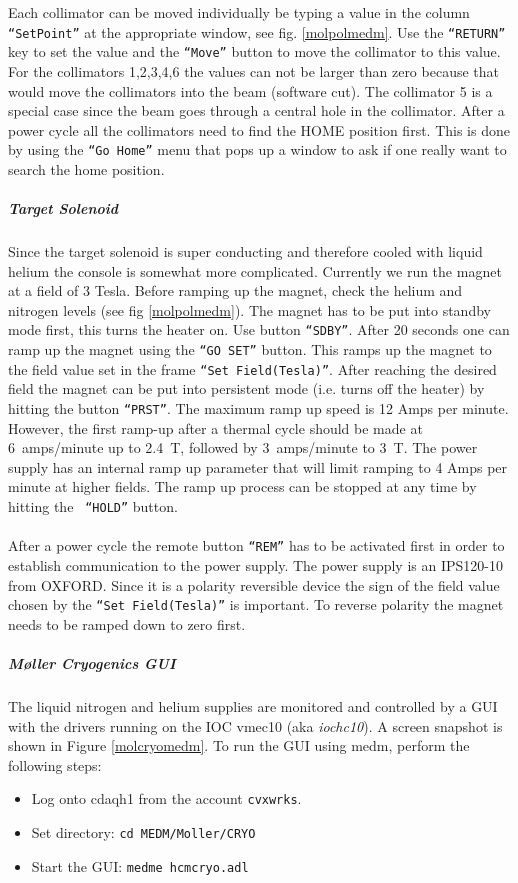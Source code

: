 {Each collimator can be moved individually be typing a value in the 
column {\tt ``SetPoint''}
at the appropriate window, see fig. \ref{molpolmedm}. Use the {\tt ``RETURN''} key
to set the value and the {\tt ``Move''} button to move the collimator
to this value. For the collimators 1,2,3,4,6 the values can not 
be larger than zero because that would move the collimators into the
beam (software cut). The collimator 5 is a special case since the beam goes through
a central hole in the collimator. 
After a power cycle all the collimators need to find the HOME position
first.  This is done by using the {\tt ``Go Home''} menu that pops up
a window to ask if one really want to search the home position. 
%
\subparagraph{Target Solenoid}
Since the target solenoid is super conducting and therefore cooled
with liquid helium the console is somewhat more complicated.
Currently we run the magnet at a field of 3 Tesla. Before ramping
up the magnet, check the helium and nitrogen levels
(see fig \ref{molpolmedm}). The magnet has to be put 
into standby mode first, this turns the heater on.  Use button {\tt ``SDBY''}. 
After 20 seconds one
can ramp up the magnet using the {\tt ``GO SET''} button. This ramps up
the magnet to the field value set in the frame {\tt ``Set Field(Tesla)''}.
After reaching the desired field the magnet can be put into persistent mode 
(i.e. turns off the heater) by hitting the button {\tt ``PRST''}. 
The maximum ramp up speed is 12 Amps per minute. 
However, the first ramp-up after a thermal cycle should be made at
6~amps/minute up to 2.4~T, followed by 3~amps/minute to 3~T.
The power supply has an internal ramp up parameter
that will limit ramping to 4 Amps per minute at higher fields.
The ramp up process can be stopped at any time by hitting the {\tt
``HOLD''} button. \\ \\
After a power cycle the remote button {\tt ``REM''} has to be activated
first in order to establish communication to the power supply.
The power supply is an IPS120-10 from OXFORD. Since it is a polarity
reversible device the sign of the field value chosen by the
{\tt ``Set Field(Tesla)''} is important. To reverse polarity the magnet
needs to be ramped down to zero first.
%


\newpage
\subparagraph{M\o ller Cryogenics GUI}
The liquid nitrogen and helium supplies are monitored and controlled by
a GUI with the drivers running on the IOC vmec10 (aka {\it iochc10}).
A screen snapshot is shown in Figure \ref{molcryomedm}.
To run the GUI using medm, perform the following steps:
\begin{itemize}
\item Log onto cdaqh1 from the account {\tt cvxwrks}.
\item Set directory: \texttt{cd MEDM/Moller/CRYO}
\item Start the GUI: \texttt{medme hcmcryo.adl}
\end{itemize}

}

